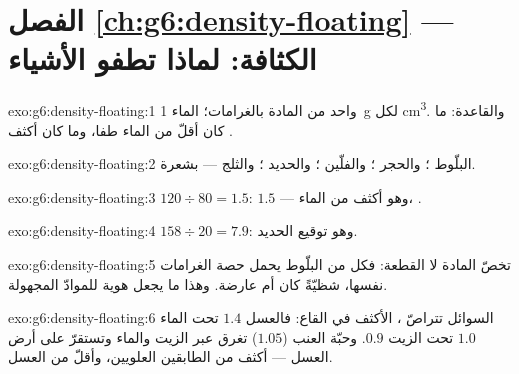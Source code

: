 \section*{الفصل \ref{ch:g6:density-floating} --- الكثافة: لماذا تطفو الأشياء}

\begin{solution}{exo:g6:density-floating:1}
  واحد من المادة بالغرامات؛  الماء
\qty{1}{g} لكل \unit{cm^3}. والقاعدة: ما كان أقلّ  من
الماء طفا، وما كان أكثف .
\end{solution}

\begin{solution}{exo:g6:density-floating:2}
البلّوط ؛ والحجر ؛ والفلّين ؛ والحديد ؛ والثلج
 --- بشعرة.
\end{solution}

\begin{solution}{exo:g6:density-floating:3}
$120 \div 80 = 1.5$:  $1.5$ --- وهو أكثف من الماء،
.
\end{solution}

\begin{solution}{exo:g6:density-floating:4}
$158 \div 20 = 7.9$: وهو توقيع الحديد.
\end{solution}

\begin{solution}{exo:g6:density-floating:5}
 تخصّ المادة لا القطعة: فكل  من البلّوط
يحمل حصة الغرامات نفسها، شظيّةً كان أم عارضة. وهذا ما يجعل
  هوية للموادّ المجهولة.
\end{solution}

\begin{solution}{exo:g6:density-floating:6}
السوائل تتراصّ ، الأكثف في القاع: فالعسل $1.4$ تحت
الماء $1.0$ تحت الزيت $0.9$. وحبّة العنب ($1.05$) تغرق عبر
الزيت والماء وتستقرّ على أرض العسل --- أكثف من الطابقين
العلويين، وأقلّ  من العسل.
\end{solution}

